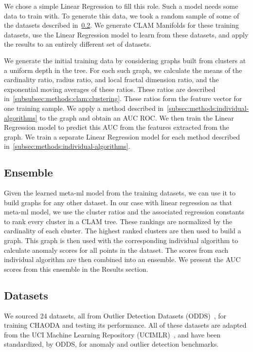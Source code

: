 We chose a simple Linear Regression to fill this role.
Such a model needs some data to train with.
To generate this data, we took a random sample of some of the datasets described in~\ref{subsec:methods:datasets}.
We generate CLAM Manifolds for these training datasets, use the Linear Regression model to learn from these datasets, and apply the results to an entirely different set of datasets.

We generate the initial training data by considering graphs built from clusters at a uniform depth in the tree.
For each such graph, we calculate the means of the cardinality ratio, radius ratio, and local fractal dimension ratio, and the exponential moving averages of these ratios.
These ratios are described in~\ref{subsubsec:methods:clam:clustering}.
These ratios form the feature vector for one training sample.
We apply a method described in~\ref{subsec:methods:individual-algorithms} to the graph and obtain an AUC ROC\@.
We then train the Linear Regression model to predict this AUC from the features extracted from the graph.
We train a separate Linear Regression model for each method described in~\ref{subsec:methods:individual-algorithms}.


\subsection{Ensemble}
\label{subsec:methods:ensemble}
Given the learned meta-ml model from the training datasets, we can use it to build graphs for any other dataset.
In our case with linear regression as that meta-ml model, we use the cluster ratios and the associated regression constants to rank every cluster in a CLAM tree.
These rankings are normalized by the cardinality of each cluster.
The highest ranked clusters are then used to build a graph.
This graph is then used with the corresponding individual algorithm to calculate anomaly scores for all points in the dataset.
The scores from each individual algorithm are then combined into an ensemble.
We present the AUC scores from this ensemble in the Results section.


\subsection{Datasets}
\label{subsec:methods:datasets}

We sourced 24 datasets, all from Outlier Detection Datasets (ODDS)~\cite{rayana2016odds}, for training CHAODA and testing its performance.
All of these datasets are adapted from the UCI Machine Learning Repository (UCIMLR)~\cite{UCIMLR}, and have been standardized, by ODDS, for anomaly and outlier detection benchmarks.

